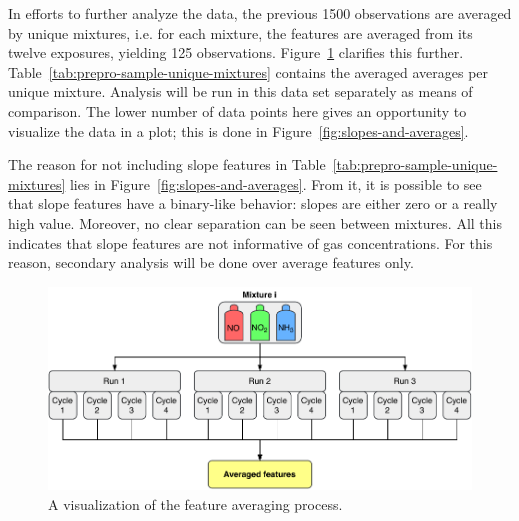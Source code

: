 In efforts to further analyze the data, the previous 1500 observations are averaged by unique mixtures, i.e. for each mixture, the features are averaged from its twelve exposures, yielding 125 observations. Figure~\ref{fig:averaging-process} clarifies this further. Table~\ref{tab:prepro-sample-unique-mixtures} contains the averaged averages per unique mixture. Analysis will be run in this data set separately as means of comparison. The lower number of data points here gives an opportunity to visualize the data in a plot; this is done in Figure~\ref{fig:slopes-and-averages}. 

The reason for not including slope features in Table~\ref{tab:prepro-sample-unique-mixtures}  lies in Figure~\ref{fig:slopes-and-averages}. From it, it is possible to see that slope features have a binary-like behavior: slopes are either zero or a really high value. Moreover, no clear separation can be seen between mixtures. All this indicates that slope features are not informative of gas concentrations. For this reason, secondary analysis will be done over average features only.

\begin{figure}[h]
	\centering
	\includegraphics[width=1\textwidth]{../figures/averaging-process.pdf}
	\caption{A visualization of the feature averaging process.}
	\label{fig:averaging-process}
\end{figure}



